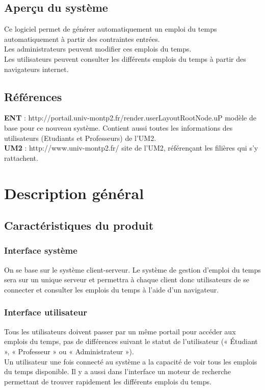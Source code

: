 \documentclass[a4paper, 11pt]{article}
\begin{document}
        \subsection{ Aperçu du système}
	Ce logiciel permet de générer automatiquement un emploi du temps automatiquement à partir des contraintes entrées.\\
	Les administrateurs peuvent modifier ces emplois du temps.\\
	Les utilisateurs peuvent consulter les différents emplois du temps à partir des navigateurs internet.
        \subsection{ Références}
        \textbf{ENT} : http://portail.univ-montp2.fr/render.userLayoutRootNode.uP modèle de base pour ce nouveau système. Contient aussi toutes les informations des utilisateurs (Etudiants et Professeurs) de l'UM2.
        \\\textbf{UM2} : http://www.univ-montp2.fr/ site de l'UM2, référençant les filières qui s'y rattachent.
        \clearpage
        \section{ Description général}
        \subsection{ Caractéristiques du produit}
        \subsubsection{ Interface système}
	On se base sur le système client-serveur. Le système de gestion d'emploi du temps sera sur un unique serveur et permettra à chaque client donc utilisateurs de se connecter et consulter les emplois du temps à l'aide d'un navigateur.
        \subsubsection{ Interface utilisateur}
        Tous les utilisateurs doivent passer par un même portail pour accéder aux emplois du temps, pas de différences suivant le statut de l'utilisateur (« Étudiant », « Professeur » ou « Administrateur »).\\
	Un utilisateur une fois connecté au système a la capacité de voir tous les emplois du temps disponible. Il y a aussi dans l'interface un moteur de recherche permettant de trouver rapidement les différents emplois du temps.\\
\end{document}

